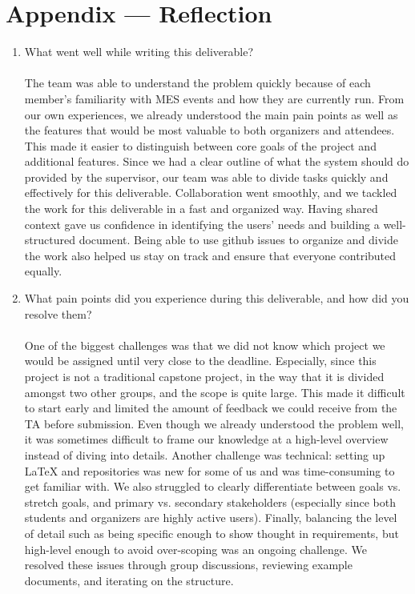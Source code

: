 \documentclass{article}
\begin{document}
\newpage

\section*{Appendix --- Reflection}




\begin{enumerate}
    \item What went well while writing this deliverable?
    \\
    \\The team was able to understand the problem quickly because of each member's familiarity with MES events and how they are currently run.
     From our own experiences, we already understood the main pain points as well as the features that would be most valuable
     to both organizers and attendees. This made it easier to distinguish between core goals of the project and additional features. Since we
     had a clear outline of what the system should do provided by the supervisor, our team was able to divide tasks quickly and effectively
      for this deliverable. Collaboration went smoothly, and we tackled the work for this deliverable in a fast and organized way. Having shared context
      gave us confidence in identifying the users' needs and building a well-structured document. Being able to use github issues to organize and divide
      the work also helped us stay on track and ensure that everyone contributed equally.
    \item What pain points did you experience during this deliverable, and how
    did you resolve them?
    \\
    \\One of the biggest challenges was that we did not know which project we would be assigned until very close to the deadline.
     Especially, since this project is not a traditional capstone project, in the way that it is divided amongst two other groups, and the scope is quite large.
     This made it difficult to start early and limited the amount of feedback we could receive from the TA before submission. Even
      though we already understood the problem well, it was sometimes difficult to frame our knowledge at a high-level overview
     instead of diving into details. Another challenge was technical: setting up LaTeX and repositories was new for some of us and
      was time-consuming to get familiar with. We also struggled to clearly differentiate between goals vs. stretch goals, and 
      primary vs. secondary stakeholders (especially since both students and organizers are highly active users). Finally, balancing
     the level of detail such as being specific enough to show thought in requirements, but high-level enough to avoid over-scoping was an ongoing
      challenge. We resolved these issues through group discussions, reviewing example documents, and iterating on the structure.


\end{enumerate}
\end{document}
